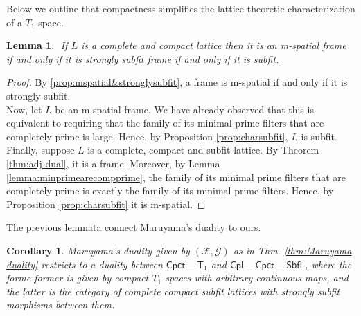\documentclass{article}
\theoremstyle{plain}
\newtheorem{lemma}[theorem]{Lemma}
\newtheorem{corollary}[theorem]{Corollary}
\theoremstyle{definition}
\theoremstyle{remark}
\newcommand{\bool}[1]{\mathsf{#1}}
\newcommand{\0}{\mathbbm 0}
\newcommand{\1}{\mathbbm 1}
\newcommand{\2}{\mathbbm 2}
\begin{document}


Below we outline that compactness simplifies the lattice-theoretic characterization of a $T_1$-space.

\begin{lemma}
\label{lemma:m-spatial&subfit}\( \)
 If  \(L\) is a complete and compact lattice then it is an m-spatial frame if and only if it is strongly subfit frame if and only if it is subfit.
\end{lemma}
\begin{proof} By \ref{prop:mspatial&stronglysubfit}, a frame is  m-spatial if and only if it is strongly subfit.\\
Now, let \(L\) be an m-spatial frame.
We have already observed that this is equivalent to requiring that the family of its minimal prime filters that are completely prime is large. Hence, by Proposition \ref{prop:charsubfit},  \(L\) is subfit.  \\ Finally, suppose  \(L\)  is a complete, compact and subfit lattice. By Theorem \ref{thm:adj-dual}, it is a frame. Moreover, by Lemma \ref{lemma:minprimearecompprime}, the family of its minimal prime filters that are completely prime is exactly the family of its minimal prime filters. Hence, by Proposition \ref{prop:charsubfit} it is m-spatial. 
    
\end{proof}
The previous lemmata connect Maruyama's duality to ours.

\begin{corollary}
Maruyama's duality given by 
  \((\mathcal{F}, \mathcal{G})\) as in Thm. \ref{thm:Maruyama duality} 
restricts to a duality between \(\bool{Cpct}-\bool{T}_1\) and \(\bool{Cpl-Cpct-SbfL}\), where the forme former is given by compact $T_1$-spaces with \emph{arbitrary} continuous maps, and the latter is the category of complete compact subfit lattices with strongly subfit morphisms between them.
\end{corollary}
\end{document}
